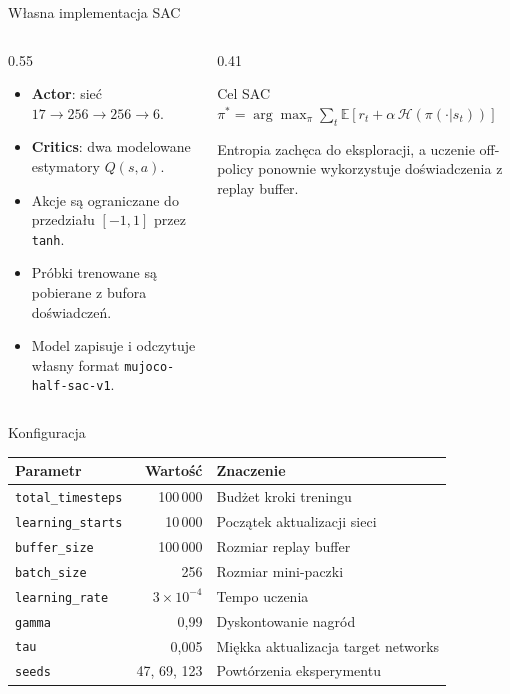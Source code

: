 \documentclass[aspectratio=169,11pt]{beamer}
\begin{document}
\begin{frame}{Własna implementacja SAC}
  \begin{columns}[T,onlytextwidth]
    \begin{column}{0.55\textwidth}
      \begin{itemize}
        \item \textbf{Actor}: sieć $17 \rightarrow 256 \rightarrow 256 \rightarrow 6$.
        \item \textbf{Critics}: dwa modelowane estymatory $Q(s,a)$.
        \item Akcje są ograniczane do przedziału $[-1,1]$ przez \texttt{tanh}.
        \item Próbki trenowane są pobierane z bufora doświadczeń.
        \item Model zapisuje i odczytuje własny format \texttt{mujoco-half-sac-v1}.
      \end{itemize}
    \end{column}
    \begin{column}{0.41\textwidth}
      \begin{block}{Cel SAC}
        \centering
        \vspace{0.3em}
        $\pi^*=\arg\max_\pi
        \sum_t \mathbb{E}\left[r_t+\alpha\,\mathcal{H}(\pi(\cdot|s_t))\right]$
        \vspace{0.3em}
      \end{block}
      \vspace{0.5em}
      \small Entropia zachęca do eksploracji, a uczenie off-policy
      ponownie wykorzystuje doświadczenia z replay buffer.
    \end{column}
  \end{columns}
\end{frame}

\begin{frame}{Konfiguracja}
  \centering
  \begin{tabular}{@{}lrp{}@{}}
    \toprule
    Parametr & Wartość & Znaczenie \\
    \midrule
    \texttt{total\_timesteps} & 100\,000 & Budżet kroki treningu \\
    \texttt{learning\_starts} & 10\,000 & Początek aktualizacji sieci \\
    \texttt{buffer\_size} & 100\,000 & Rozmiar replay buffer \\
    \texttt{batch\_size} & 256 & Rozmiar mini-paczki \\
    \texttt{learning\_rate} & $3\times10^{-4}$ & Tempo uczenia \\
    \texttt{gamma} & 0{,}99 & Dyskontowanie nagród \\
    \texttt{tau} & 0{,}005 & Miękka aktualizacja target networks \\
    \texttt{seeds} & 47, 69, 123 & Powtórzenia eksperymentu \\
    \bottomrule
  \end{tabular}
  \vspace{0.7em}

\end{frame}
\end{document}
